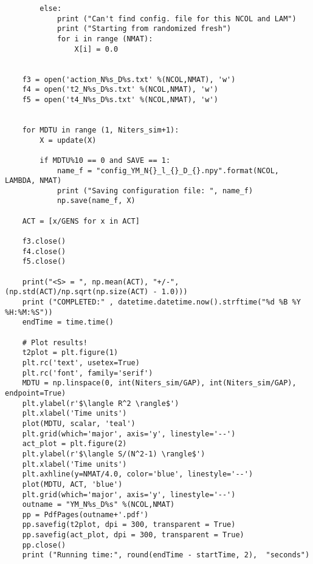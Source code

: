 \begin{lstlisting}
        else: 
            print ("Can't find config. file for this NCOL and LAM")
            print ("Starting from randomized fresh")
            for i in range (NMAT):  
                X[i] = 0.0


    f3 = open('action_N%s_D%s.txt' %(NCOL,NMAT), 'w')
    f4 = open('t2_N%s_D%s.txt' %(NCOL,NMAT), 'w')
    f5 = open('t4_N%s_D%s.txt' %(NCOL,NMAT), 'w')


    for MDTU in range (1, Niters_sim+1): 
        X = update(X)

        if MDTU%10 == 0 and SAVE == 1:
            name_f = "config_YM_N{}_l_{}_D_{}.npy".format(NCOL, LAMBDA, NMAT)
            print ("Saving configuration file: ", name_f)
            np.save(name_f, X)

    ACT = [x/GENS for x in ACT] 

    f3.close()
    f4.close()
    f5.close()
    
    print("<S> = ", np.mean(ACT), "+/-", (np.std(ACT)/np.sqrt(np.size(ACT) - 1.0)))
    print ("COMPLETED:" , datetime.datetime.now().strftime("%d %B %Y %H:%M:%S")) 
    endTime = time.time() 

    # Plot results!
    t2plot = plt.figure(1) 
    plt.rc('text', usetex=True)
    plt.rc('font', family='serif')
    MDTU = np.linspace(0, int(Niters_sim/GAP), int(Niters_sim/GAP), endpoint=True)
    plt.ylabel(r'$\langle R^2 \rangle$')
    plt.xlabel('Time units')
    plot(MDTU, scalar, 'teal') 
    plt.grid(which='major', axis='y', linestyle='--')
    act_plot = plt.figure(2) 
    plt.ylabel(r'$\langle S/(N^2-1) \rangle$')
    plt.xlabel('Time units')
    plt.axhline(y=NMAT/4.0, color='blue', linestyle='--')
    plot(MDTU, ACT, 'blue') 
    plt.grid(which='major', axis='y', linestyle='--')
    outname = "YM_N%s_D%s" %(NCOL,NMAT)
    pp = PdfPages(outname+'.pdf')
    pp.savefig(t2plot, dpi = 300, transparent = True)
    pp.savefig(act_plot, dpi = 300, transparent = True)
    pp.close()
    print ("Running time:", round(endTime - startTime, 2),  "seconds")
\end{lstlisting}
